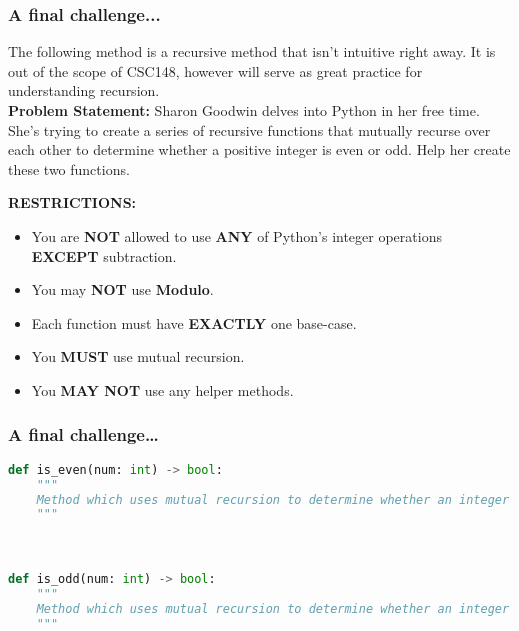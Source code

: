 \documentclass[hyperref={colorlinks,citecolor=blue,linkcolor=blue,urlcolor=blue}]{beamer}
\begin{document}
\begin{frame}
  \frametitle{A final challenge...}
  The following method is a recursive method that isn't intuitive right away. It is out of the scope of CSC148, however will serve as great practice for understanding recursion.
\\
\textbf{Problem Statement:}
Sharon Goodwin delves into Python in her free time. She’s trying to create a series of recursive functions that mutually recurse over each other to determine whether a positive integer is even or odd. Help her create these two functions.
\begin{center}
  \textbf{RESTRICTIONS:}
  \begin{itemize}
    \item You are \textbf{NOT} allowed to use \textbf{ANY} of Python's integer operations \textbf{EXCEPT} subtraction.
    \item You may \textbf{NOT} use \textbf{Modulo}.
    \item Each function must have \textbf{EXACTLY} one base-case.
    \item You \textbf{MUST} use mutual recursion.
    \item You \textbf{MAY NOT} use any helper methods.
  \end{itemize}  
\end{center}
\end{frame}
\begin{frame}[fragile]
  \frametitle{A final challenge\ldots}
  \begin{lstlisting}[language=Python, style=mystyle]
def is_even(num: int) -> bool:
    """
    Method which uses mutual recursion to determine whether an integer is even or odd.
    """



def is_odd(num: int) -> bool:
    """
    Method which uses mutual recursion to determine whether an integer is even or odd.
    """
    \end{lstlisting}    
\end{frame}
\end{document}
